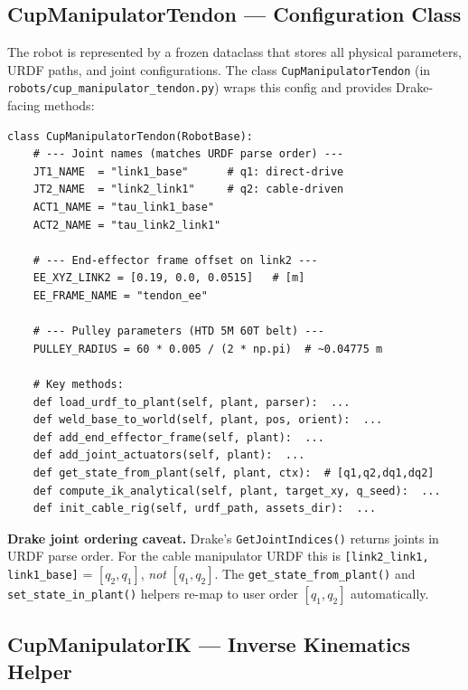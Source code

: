 \documentclass[11pt,a4paper]{article}
\begin{document}
\subsection{CupManipulatorTendon --- Configuration Class}

The robot is represented by a frozen dataclass that stores all physical parameters, URDF paths, and joint configurations.  The class \texttt{CupManipulatorTendon} (in \texttt{robots/cup\_manipulator\_tendon.py}) wraps this config and provides Drake-facing methods:

\begin{lstlisting}[caption={Key constants and methods of \texttt{CupManipulatorTendon}.}]
class CupManipulatorTendon(RobotBase):
    # --- Joint names (matches URDF parse order) ---
    JT1_NAME  = "link1_base"      # q1: direct-drive
    JT2_NAME  = "link2_link1"     # q2: cable-driven
    ACT1_NAME = "tau_link1_base"
    ACT2_NAME = "tau_link2_link1"

    # --- End-effector frame offset on link2 ---
    EE_XYZ_LINK2 = [0.19, 0.0, 0.0515]   # [m]
    EE_FRAME_NAME = "tendon_ee"

    # --- Pulley parameters (HTD 5M 60T belt) ---
    PULLEY_RADIUS = 60 * 0.005 / (2 * np.pi)  # ~0.04775 m

    # Key methods:
    def load_urdf_to_plant(self, plant, parser):  ...
    def weld_base_to_world(self, plant, pos, orient):  ...
    def add_end_effector_frame(self, plant):  ...
    def add_joint_actuators(self, plant):  ...
    def get_state_from_plant(self, plant, ctx):  # [q1,q2,dq1,dq2]
    def compute_ik_analytical(self, plant, target_xy, q_seed):  ...
    def init_cable_rig(self, urdf_path, assets_dir):  ...
\end{lstlisting}

\begin{warnbox}
\textbf{Drake joint ordering caveat.}  Drake's \texttt{GetJointIndices()} returns joints in URDF parse order.  For the cable manipulator URDF this is \texttt{[link2\_link1, link1\_base]} = $[q_2, q_1]$, \emph{not} $[q_1, q_2]$.  The \texttt{get\_state\_from\_plant()} and \texttt{set\_state\_in\_plant()} helpers re-map to user order $[q_1, q_2]$ automatically.
\end{warnbox}

\subsection{CupManipulatorIK --- Inverse Kinematics Helper}
\end{document}
